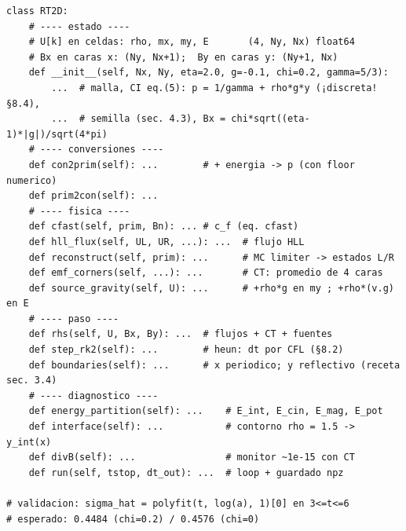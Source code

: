 \documentclass[11pt,a4paper]{article}
\begin{document}
{\footnotesize
\begin{verbatim}
class RT2D:
    # ---- estado ----
    # U[k] en celdas: rho, mx, my, E       (4, Ny, Nx) float64
    # Bx en caras x: (Ny, Nx+1);  By en caras y: (Ny+1, Nx)
    def __init__(self, Nx, Ny, eta=2.0, g=-0.1, chi=0.2, gamma=5/3):
        ...  # malla, CI eq.(5): p = 1/gamma + rho*g*y (¡discreta! §8.4),
        ...  # semilla (sec. 4.3), Bx = chi*sqrt((eta-1)*|g|)/sqrt(4*pi)
    # ---- conversiones ----
    def con2prim(self): ...        # + energia -> p (con floor numerico)
    def prim2con(self): ...
    # ---- fisica ----
    def cfast(self, prim, Bn): ... # c_f (eq. cfast)
    def hll_flux(self, UL, UR, ...): ...  # flujo HLL
    def reconstruct(self, prim): ...      # MC limiter -> estados L/R
    def emf_corners(self, ...): ...       # CT: promedio de 4 caras
    def source_gravity(self, U): ...      # +rho*g en my ; +rho*(v.g) en E
    # ---- paso ----
    def rhs(self, U, Bx, By): ...  # flujos + CT + fuentes
    def step_rk2(self): ...        # heun: dt por CFL (§8.2)
    def boundaries(self): ...      # x periodico; y reflectivo (receta sec. 3.4)
    # ---- diagnostico ----
    def energy_partition(self): ...    # E_int, E_cin, E_mag, E_pot
    def interface(self): ...           # contorno rho = 1.5 -> y_int(x)
    def divB(self): ...                # monitor ~1e-15 con CT
    def run(self, tstop, dt_out): ...  # loop + guardado npz

# validacion: sigma_hat = polyfit(t, log(a), 1)[0] en 3<=t<=6
# esperado: 0.4484 (chi=0.2) / 0.4576 (chi=0)
\end{verbatim}
}
\end{document}
